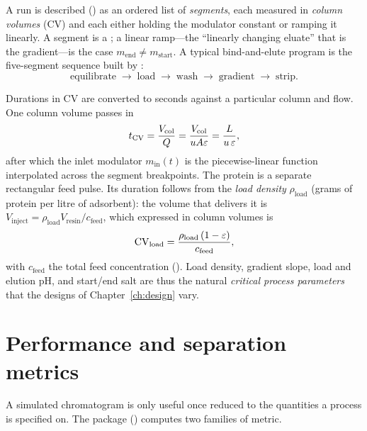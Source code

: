 A run is described () as an ordered list
of \emph{segments}, each measured in \emph{column volumes} (CV) and each either
holding the modulator constant or ramping it linearly. A segment is a
; a linear ramp---the
``linearly changing eluate'' that is the gradient---is the case
$m_{\mathrm{end}}\neq m_{\mathrm{start}}$. A typical bind-and-elute program is
the five-segment sequence built by :
%
\[
\text{equilibrate} \;\to\; \text{load} \;\to\; \text{wash}
\;\to\; \text{gradient} \;\to\; \text{strip}.
\]

Durations in CV are converted to seconds against a particular column and flow.
One column volume passes in
%
\begin{equation}
t_{\mathrm{CV}} = \frac{V_{\mathrm{col}}}{Q} = \frac{V_{\mathrm{col}}}{u A \varepsilon}
= \frac{L}{u\,\varepsilon},
\label{eq:tcv}
\end{equation}
%
after which the inlet modulator $m_{\mathrm{in}}(t)$ is the piecewise-linear
function interpolated across the segment breakpoints. The protein
 is a separate rectangular feed pulse. Its duration follows from
the \emph{load density} $\rho_{\mathrm{load}}$ (grams of protein per litre of
adsorbent): the volume that delivers it is $V_{\mathrm{inject}} =
\rho_{\mathrm{load}} V_{\mathrm{resin}} / c_{\mathrm{feed}}$, which expressed in
column volumes is
%
\begin{equation}
\mathrm{CV}_{\mathrm{load}}
= \frac{\rho_{\mathrm{load}}\,(1-\varepsilon)}{c_{\mathrm{feed}}},
\label{eq:loadcv}
\end{equation}
%
with $c_{\mathrm{feed}}$ the total feed concentration
(). Load density, gradient slope, load and
elution pH, and start/end salt are thus the natural \emph{critical process
parameters} that the designs of Chapter~\ref{ch:design} vary.

\section{Performance and separation metrics}
\label{sec:metrics}

A simulated chromatogram is only useful once reduced to the quantities a process
is specified on. The package () computes
two families of metric.

